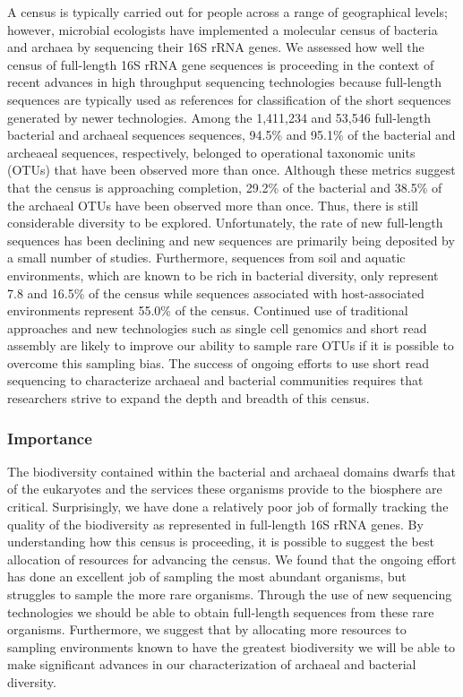 \documentclass[11pt,]{article}
\begin{document}
A census is typically carried out for people across a range of
geographical levels; however, microbial ecologists have implemented a
molecular census of bacteria and archaea by sequencing their 16S rRNA
genes. We assessed how well the census of full-length 16S rRNA gene
sequences is proceeding in the context of recent advances in high
throughput sequencing technologies because full-length sequences are
typically used as references for classification of the short sequences
generated by newer technologies. Among the 1,411,234 and 53,546
full-length bacterial and archaeal sequences sequences, 94.5\% and
95.1\% of the bacterial and archeaeal sequences, respectively, belonged
to operational taxonomic units (OTUs) that have been observed more than
once. Although these metrics suggest that the census is approaching
completion, 29.2\% of the bacterial and 38.5\% of the archaeal OTUs have
been observed more than once. Thus, there is still considerable
diversity to be explored. Unfortunately, the rate of new full-length
sequences has been declining and new sequences are primarily being
deposited by a small number of studies. Furthermore, sequences from soil
and aquatic environments, which are known to be rich in bacterial
diversity, only represent 7.8 and 16.5\% of the census while sequences
associated with host-associated environments represent 55.0\% of the
census. Continued use of traditional approaches and new technologies
such as single cell genomics and short read assembly are likely to
improve our ability to sample rare OTUs if it is possible to overcome
this sampling bias. The success of ongoing efforts to use short read
sequencing to characterize archaeal and bacterial communities requires
that researchers strive to expand the depth and breadth of this census.

\subsubsection{Importance}\label{importance}

The biodiversity contained within the bacterial and archaeal domains
dwarfs that of the eukaryotes and the services these organisms provide
to the biosphere are critical. Surprisingly, we have done a relatively
poor job of formally tracking the quality of the biodiversity as
represented in full-length 16S rRNA genes. By understanding how this
census is proceeding, it is possible to suggest the best allocation of
resources for advancing the census. We found that the ongoing effort has
done an excellent job of sampling the most abundant organisms, but
struggles to sample the more rare organisms. Through the use of new
sequencing technologies we should be able to obtain full-length
sequences from these rare organisms. Furthermore, we suggest that by
allocating more resources to sampling environments known to have the
greatest biodiversity we will be able to make significant advances in
our characterization of archaeal and bacterial diversity.
\end{document}

